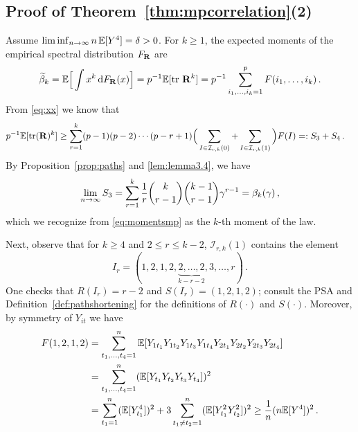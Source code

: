 \subsection{Proof of Theorem~\ref{thm:mpcorrelation}(2)}\label{sec:5.5}
Assume $\liminf_{n \to \infty} n\,\mathbb{E} [ Y^4] =\delta >0$.
For $k\ge 1$, the expected moments of the empirical spectral distribution $F_{\mathbf R}$ are 
\begin{equation}\label{eq:expmomentsr}
\widetilde \beta_k = \mathbb{E}\Big[\int x^k \,\mathrm{d} F_{{\mathbf R}}(x)\Big]=p^{-1}\mathbb{E}[\operatorname{tr}\,{\mathbf R}^k]=p^{-1}\sum_{i_1,\ldots,i_k=1}^p F(i_1,\ldots,i_k)\,.
\end{equation}
From \eqref{eq:xx} we know that 
\begin{equation*}
\begin{split}
p^{-1}\E[\tr(\bfR)^k]%
&\ge \sum_{r=1}^k (p-1)(p-2)\cdots (p-r+1) \Big(\sum_{I\in \mathcal{I}_{r,k}(0)} +\sum_{I\in \mathcal{I}_{r,k}(1)}\Big)
F(I)  =: S_3+S_4\,.
\end{split}
\end{equation*}
By Proposition~\ref{prop:paths} and \eqref{lem:lemma3.4}, we have
\begin{equation}\label{eq:sumS11}
\lim_{n \to \infty} S_3 = \sum_{r=1}^{k} \frac{1}{r} \binom{k}{r-1}\binom{k-1}{r-1}\gamma^{r-1}=\beta_k(\gamma)\,,
\end{equation}
which we recognize from \eqref{eq:momentsmp} as the $k$-th moment of the \MP law. 
\par
Next, observe that for $k\ge 4$ and $2\le r\le k-2$, $\mathcal{I}_{r,k}(1)$ contains the element 
\begin{equation*}
I_r = (1,2,1,2,\underbrace{2,\ldots,2}_{k-r-2},3,\ldots,r)\,.
\end{equation*}
One checks that $R(I_r)=r-2$ and $S(I_r)=(1,2,1,2)$; consult the PSA and Definition~\ref{def:pathshortening} for the definitions of $R(\cdot)$ and $S(\cdot)$. Moreover, by symmetry of $Y_{it}$
we have	
\begin{equation*}
\begin{split}
F(1,2,1,2)&=
\sum_{t_1,\ldots,t_4=1}^n \mathbb{E}[ Y_{1t_1}Y_{1t_2}Y_{1t_3}Y_{1t_4} 
Y_{2t_1}Y_{2t_2}Y_{2t_3}Y_{2t_4}]\\ &= \sum_{t_1,\ldots,t_4=1}^n (\mathbb{E}[ Y_{t_1}Y_{t_2}Y_{t_3}Y_{t_4} ])^2\\
&= \sum_{t_1=1}^n (\mathbb{E}[ Y_{t_1}^4])^2 + 3 \sum_{t_1\neq t_2=1}^n (\mathbb{E}[ Y_{t_1}^2Y_{t_2}^2 ])^2\ge \frac{1}{n} (n\mathbb{E}[ Y^4])^2\,.
\end{split}
\end{equation*}
